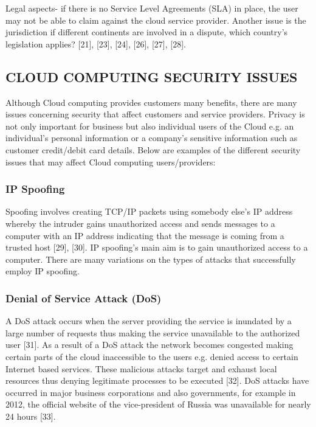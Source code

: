 \documentclass[10pt,journal,compsoc]{IEEEtran}
\begin{document}
\vspace{2mm}
Legal aspects- if there is no Service Level Agreements (SLA) in place, the user may not be able to claim against the cloud service provider. Another issue is the jurisdiction if different continents are involved in a dispute, which country’s legislation applies?  [21], [23], [24], [26], [27], [28].


\subsection{CLOUD COMPUTING SECURITY ISSUES}
\vspace{2mm}

Although Cloud computing provides customers many benefits, there are many issues concerning security that affect customers and service providers. Privacy is not only important for business but also individual users of the 	Cloud e.g. an individual’s personal information or a company’s sensitive information such as customer credit/debit card details. Below are examples of the different security issues that may affect Cloud computing users/providers:

\vspace{2mm}
\subsubsection{IP Spoofing}
Spoofing involves creating TCP/IP packets using somebody else’s IP address whereby the intruder gains unauthorized access and sends messages to a computer with an IP address indicating that the message is coming from a trusted host [29], [30]. IP spoofing’s main aim is to gain unauthorized access to a computer. There are many variations on the types of attacks that successfully employ IP spoofing.


\vspace{2mm}
\subsubsection{Denial of Service Attack (DoS)}
A DoS attack occurs when the server providing the service is inundated by a large number of requests thus making the service unavailable to the authorized user [31]. As a result of a DoS attack the network becomes congested making certain parts of the cloud inaccessible to the users e.g. denied access to certain Internet based services. These malicious attacks target and exhaust local resources thus denying legitimate processes to be executed [32].  DoS attacks have occurred in major business corporations and also governments, for example in 2012, the official website of the vice-president of Russia was unavailable for nearly 24 hours [33].
\end{document}
